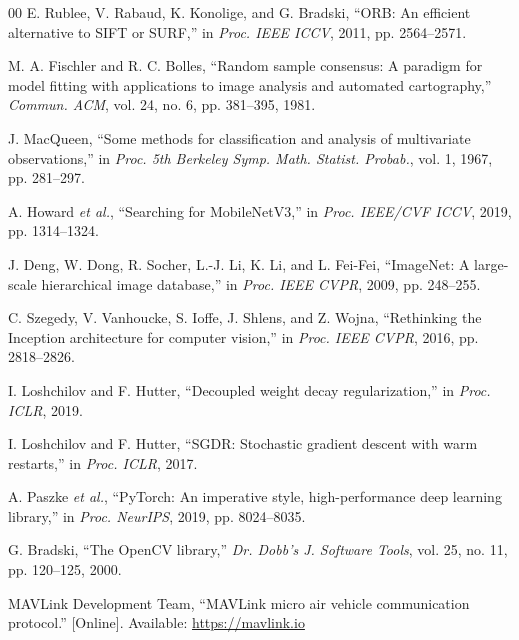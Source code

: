 \documentclass[conference]{IEEEtran}
\begin{document}
\begin{thebibliography}{00}
 E. Rublee, V. Rabaud, K. Konolige, and G. Bradski, ``ORB:
An efficient alternative to SIFT or SURF,'' in \emph{Proc. IEEE ICCV}, 2011,
pp. 2564--2571.

 M. A. Fischler and R. C. Bolles, ``Random sample
consensus: A paradigm for model fitting with applications to image analysis and
automated cartography,'' \emph{Commun. ACM}, vol. 24, no. 6, pp. 381--395,
1981.

 J. MacQueen, ``Some methods for classification and
analysis of multivariate observations,'' in \emph{Proc. 5th Berkeley Symp. Math.
Statist. Probab.}, vol. 1, 1967, pp. 281--297.

 A. Howard \emph{et al.}, ``Searching for MobileNetV3,'' in
\emph{Proc. IEEE/CVF ICCV}, 2019, pp. 1314--1324.

 J. Deng, W. Dong, R. Socher, L.-J. Li, K. Li, and L. Fei-Fei,
``ImageNet: A large-scale hierarchical image database,'' in \emph{Proc. IEEE
CVPR}, 2009, pp. 248--255.

 C. Szegedy, V. Vanhoucke, S. Ioffe, J. Shlens, and
Z. Wojna, ``Rethinking the Inception architecture for computer vision,'' in
\emph{Proc. IEEE CVPR}, 2016, pp. 2818--2826.

 I. Loshchilov and F. Hutter, ``Decoupled weight decay
regularization,'' in \emph{Proc. ICLR}, 2019.

 I. Loshchilov and F. Hutter, ``SGDR: Stochastic
gradient descent with warm restarts,'' in \emph{Proc. ICLR}, 2017.

 A. Paszke \emph{et al.}, ``PyTorch: An imperative style,
high-performance deep learning library,'' in \emph{Proc. NeurIPS}, 2019,
pp. 8024--8035.

 G. Bradski, ``The OpenCV library,'' \emph{Dr. Dobb's J.
Software Tools}, vol. 25, no. 11, pp. 120--125, 2000.

 MAVLink Development Team, ``MAVLink micro air vehicle
communication protocol.'' [Online]. Available: \url{https://mavlink.io}

\end{thebibliography}
\end{document}
